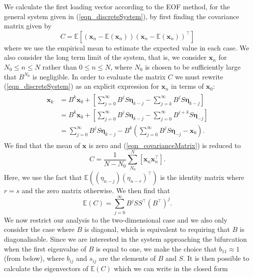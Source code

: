 \documentclass[%
aip,
amsmath,amssymb,
reprint,%
]{revtex4-1}
\newcommand{\x}{{\mathbf x}}
\newcommand{\etab}{{\mathbf \eta}}
\newcommand{\noteRed}[1]{{#1}}
\begin{document}
We calculate the first loading vector according to the EOF method, for the general system given in (\ref{eqn_discreteSystem}), by first finding the covariance matrix given by 
\begin{equation}
C = \mathbb{E}\left[\left(\x_n-\mathbb{E}(\x_n)\right) \left(\x_n-\mathbb{E}(\x_n)\right)^\top\right]
\label{eqn_covarianceMatrix}
\end{equation} 
where we use the empirical mean to estimate the expected value in each case. We also consider the long term limit of the system, that is, we consider $\x_n$ for $N_0\leq n\leq N$ rather than $0\leq n \leq N$, where $N_0$ is chosen to be sufficiently large that $B^{N_0}$ is negligible. In order to evaluate the matrix $C$ we must rewrite (\ref{eqn_discreteSystem}) as an explicit expression for $\mathbf{x}_n$ {\noteRed in terms of $\mathbf{x}_0$:
\begin{align}
\begin{split}
\x_k &= B^k\x_0 + \left[ \sum_{j=0}^{\infty} B^{j} S \etab_{k-j} - \sum_{j=k}^{\infty} B^{j} S \etab_{k-j}\right]\\
&= B^k\x_0 + \left[ \sum_{j=0}^{\infty} B^{j} S \etab_{k-j} - \sum_{j=0}^{\infty} B^{j+k} S \etab_{-j}\right]\\
&= \sum_{j=0}^{\infty} B^{j} S \etab_{k-j} - B^k \left(\sum_{j=0}^{\infty} B^{j} S \etab_{-j} - \x_0\right).
\end{split}
\label{eqn_discreteSystem_rewrite}
\end{align}
We find that} the mean of $\x$ is zero and (\ref{eqn_covarianceMatrix}) is reduced to
\begin{equation}
C = \frac{1}{N-N_0} \sum_{N_0}^{N}\left[\x_n \x_n^\top\right].
\label{eqn_covarianceMatrix_simplified}
\end{equation} 
Here, we use the fact that $\mathbb{E}((\eta_{n-j})(\eta_{n-r})^\top)$ is the identity matrix where $r = s$ and the zero matrix otherwise. We then find that 
\begin{equation}
\mathbb{E}(C) = \sum_{j=0}^\infty B^j S S^\top (B^\top)^j.
\end{equation} 
We now restrict our analysis to the two-dimensional case and we also only consider the case where $B$ is diagonal, which is equivalent to requiring that $B$ is diagonalisable. {\noteRed Since we are interested in the system approaching the bifurcation when the first eigenvalue of $B$ is equal to one, we make the choice that $b_{11}\approx1$ (from below), where $b_{ij}$ and $s_{ij}$ are the elements of $B$ and $S$.} It is then possible to calculate the eigenvectors of $\mathbb{E}(C)$ which we can write in the closed form
\end{document}
